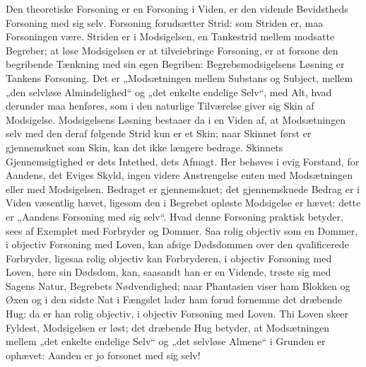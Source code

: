 \documentclass[12pt]{book}
\begin{document}
Den theoretiske Forsoning er en Forsoning i Viden, er den vidende
Bevidstheds Forsoning med sig selv. Forsoning forudsætter Strid: som
Striden er, maa Forsoningen være. Striden er i Modsigelsen, en
Tankestrid mellem modsatte Begreber; at løse Modsigelsen er at
tilveiebringe Forsoning, er at forsone den begribende Tænkning med
sin egen Begriben: Begrebsmodsigelsens Løsning er Tankens Forsoning.
Det er „Modsætningen mellem Substans og Subject, mellem „den
selvløse Almindelighed“ og „det enkelte endelige Selv“, med Alt,
hvad derunder maa henføres, som i den naturlige Tilværelse giver sig
Skin af Modsigelse. Modsigelsens Løsning bestaaer da i en Viden af,
at Modsætningen selv med den deraf følgende Strid kun er et Skin;
naar Skinnet først er gjennemskuet som Skin, kan det ikke længere
bedrage. Skinnets Gjennemsigtighed er dets Intethed, dets Afmagt.
Her behøves i evig Forstand, for Aandens, det Eviges Skyld, ingen
videre Anstrengelse enten med Modsætningen eller med Modsigelsen.
Bedraget er gjennemskuet; det gjennemskuede Bedrag er i Viden
væsentlig hævet, ligesom den i Begrebet opløste Modsigelse er
hævet: dette er „Aandens Forsoning med sig selv“. Hvad denne
Forsoning praktisk betyder, sees af Exemplet med Forbryder og
Dommer. Saa rolig objectiv som en Dommer, i objectiv Forsoning med
Loven, kan afsige Dødsdommen over den qvalificerede Forbryder,
ligesaa rolig objectiv kan Forbryderen, i objectiv Forsoning med
Loven, høre sin Dødsdom, kan, saasandt han er en Vidende, trøste sig
med Sagens Natur, Begrebets Nødvendighed; naar Phantasien viser ham
Blokken og Øxen og i den sidste Nat i Fængslet lader ham forud
fornemme det dræbende Hug: da er han rolig objectiv, i objectiv
Forsoning med Loven. Thi Loven skeer Fyldest, Modsigelsen er løst;
det dræbende Hug betyder, at Modsætningen mellem „det enkelte
endelige Selv“ og „det selvløse Almene“ i Grunden er ophævet:
Aanden er jo forsonet med sig selv!
\end{document}
